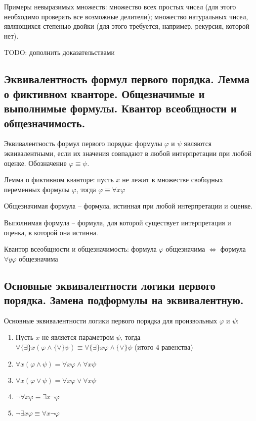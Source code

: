 \documentclass[a4paper, 10pt]{article}
\begin{document}
Примеры невыразимых множеств: множество всех простых чисел (для этого необходимо проверять все возможные делители); множество натуральных чисел, являющихся степенью двойки (для этого требуется, например, рекурсия, которой нет).

TODO: дополнить доказательствами

\subsection{Эквивалентность формул первого порядка. Лемма о фиктивном кванторе. Общезначимые и выполнимые формулы. Квантор всеобщности и общезначимость.}

Эквивалентность формул первого порядка: формулы $\varphi$ и $\psi$ являются эквивалентными, если их значения совпадают в любой интерпретации при любой оценке. Обозначение $\varphi\equiv\psi$.

Лемма о фиктивном кванторе: пусть $x$ не лежит в множестве свободных переменных формулы $\varphi$, тогда $\varphi\equiv\forall x\varphi$

Общезначимая формула -- формула, истинная при любой интерпретации и оценке.

Выполнимая формула -- формула, для которой существует интерпретация и оценка, в которой она истинна.

Квантор всеобщности и общезначимость: формула $\varphi$ общезначима $\iff$ формула $\forall y\varphi$ общезначима

\subsection{Основные эквивалентности логики первого порядка. Замена подформулы на эквивалентную.}

Основные эквивалентности логики первого порядка для произвольных $\varphi$ и $\psi$:

\begin{enumerate}
    \item Пусть $x$ не является параметром $\psi$, тогда $\forall\{\exists\} x (\varphi \land\{\lor\} \psi) \equiv \forall\{\exists\}x\varphi\land\{\lor\}\psi$ (итого 4 равенства)
    \item $\forall x (\varphi\land\psi) = \forall x\varphi \land \forall x\psi$
    \item $\forall x (\varphi\lor\psi) = \forall x\varphi \lor \forall x\psi$
    \item $\lnot\forall x\varphi \equiv \exists x \lnot \varphi$
    \item $\lnot\exists x\varphi \equiv \forall x \lnot \varphi$
\end{enumerate}
\end{document}
